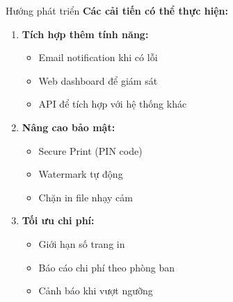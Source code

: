 \documentclass{beamer}
\begin{document}
    \begin{frame}{Hướng phát triển}
        \textbf{Các cải tiến có thể thực hiện:}
        \begin{enumerate}
            \item \textbf{Tích hợp thêm tính năng:}
                \begin{itemize}
                    \item Email notification khi có lỗi
                    \item Web dashboard để giám sát
                    \item API để tích hợp với hệ thống khác
                \end{itemize}
            \item \textbf{Nâng cao bảo mật:}
                \begin{itemize}
                    \item Secure Print (PIN code)
                    \item Watermark tự động
                    \item Chặn in file nhạy cảm
                \end{itemize}
            \item \textbf{Tối ưu chi phí:}
                \begin{itemize}
                    \item Giới hạn số trang in
                    \item Báo cáo chi phí theo phòng ban
                    \item Cảnh báo khi vượt ngưỡng
                \end{itemize}
        \end{enumerate}
    \end{frame}


\end{document}
